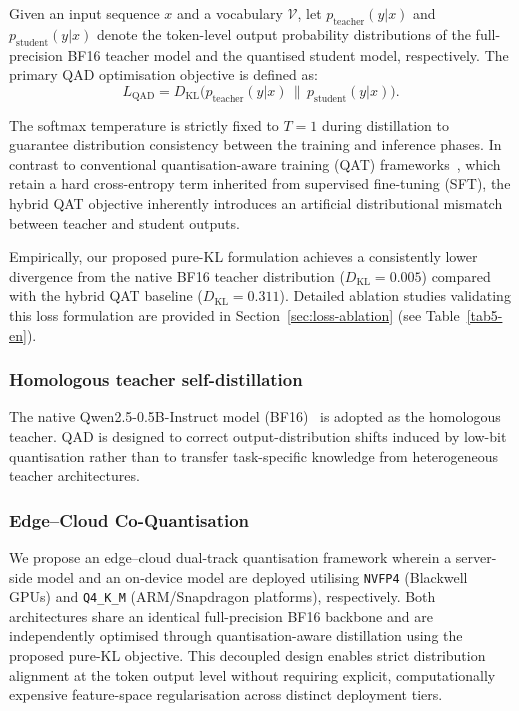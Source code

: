 \documentclass[a4paper,fleqn]{cas-sc}
\begin{document}
Given an input sequence $x$ and a vocabulary $\mathcal{V}$, let $p_{\text{teacher}}(y|x)$ and $p_{\text{student}}(y|x)$ denote the token-level output probability distributions of the full-precision BF16 teacher model and the quantised student model, respectively. The primary QAD optimisation objective is defined as:
\begin{equation}
\label{eq:kl-loss}
L_{\mathrm{QAD}} = D_{\mathrm{KL}}\!\bigl( p_{\text{teacher}}(y|x)\,\|\,p_{\text{student}}(y|x) \bigr).
\end{equation}

The softmax temperature is strictly fixed to $T = 1$ during distillation to guarantee distribution consistency between the training and inference phases. In contrast to conventional quantisation-aware training (QAT) frameworks~\citep{24,25,26}, which retain a hard cross-entropy term inherited from supervised fine-tuning (SFT), the hybrid QAT objective inherently introduces an artificial distributional mismatch between teacher and student outputs.

Empirically, our proposed pure-KL formulation achieves a consistently lower divergence from the native BF16 teacher distribution ($D_{\mathrm{KL}} = 0.005$) compared with the hybrid QAT baseline ($D_{\mathrm{KL}} = 0.311$). Detailed ablation studies validating this loss formulation are provided in Section~\ref{sec:loss-ablation} (see Table~\ref{tab5-en}).

\subsubsection{Homologous teacher self-distillation}

The native Qwen2.5-0.5B-Instruct model (BF16)~\citep{27,28,29} is adopted as the homologous teacher. QAD is designed to correct output-distribution shifts induced by low-bit quantisation rather than to transfer task-specific knowledge from heterogeneous teacher architectures.

\subsubsection{Edge--Cloud Co-Quantisation}

We propose an edge--cloud dual-track quantisation framework wherein a server-side model and an on-device model are deployed utilising \texttt{NVFP4} (Blackwell GPUs) and \texttt{Q4\_K\_M} (ARM/Snapdragon platforms), respectively. Both architectures share an identical full-precision BF16 backbone and are independently optimised through quantisation-aware distillation using the proposed pure-KL objective. This decoupled design enables strict distribution alignment at the token output level without requiring explicit, computationally expensive feature-space regularisation across distinct deployment tiers.
\end{document}
